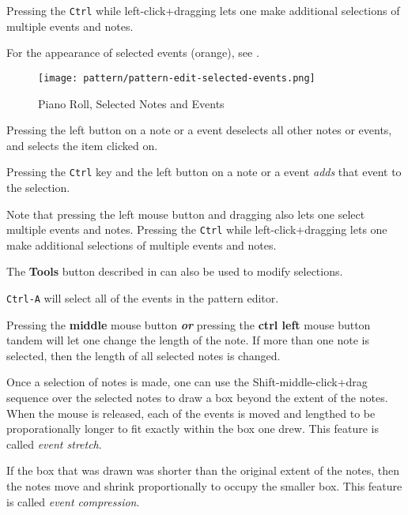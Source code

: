    Pressing the \texttt{Ctrl} while left-click+dragging lets one
   make additional selections of multiple events and notes.

   For the appearance of selected events (orange), see
   .

\begin{figure}[H]
   \centering 
   \texttt{[image: pattern/pattern-edit-selected-events.png]}
   \caption{Piano Roll, Selected Notes and Events}
   \label{fig:pattern_editor_selected_events}
\end{figure}

   Pressing the left button on a note or a event deselects all other notes
   or events, and selects the item clicked on.

   Pressing the \texttt{Ctrl} key and the left button on a note or a event
   \textsl{adds} that event to the selection.

   Note that pressing the left mouse button and dragging also lets one
   select multiple events and notes.
   Pressing the \texttt{Ctrl} while left-click+dragging lets one
   make additional selections of multiple events and notes.

   The \textbf{Tools} button described in
    can also be used to
   modify selections.

   \texttt{Ctrl-A} will select all of the events in the pattern editor.

   Pressing the \textbf{middle} mouse button \textbf{\textsl{or}}
   pressing the \textbf{ctrl left} mouse button tandem will let one change 
	the length of the note. 
   If more than one note is selected, then the length of all selected notes
   is changed.

   Once a selection of notes is made, one can use the
   Shift-middle-click+drag sequence over the selected notes to
   draw a box beyond the extent of the notes.  When the mouse is released,
   each of the events is moved and lengthed to be proporationally longer to
   fit exactly within the box one drew.
   This feature is called \textsl{event stretch}.

   If the box that was drawn was shorter than the original extent of the
   notes, then the notes move and shrink proportionally to occupy the
   smaller box.
   This feature is called \textsl{event compression}.
   
